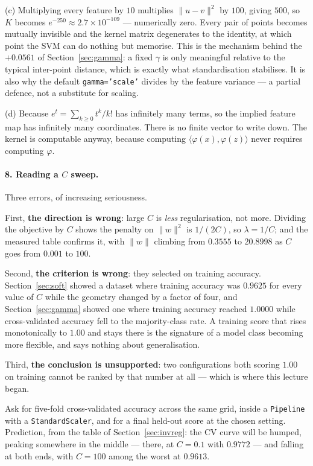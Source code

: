 \documentclass[11pt]{article}
\begin{document}
(c) Multiplying every feature by $10$ multiplies $\|u-v\|^2$ by $100$, giving
$500$, so $K$ becomes $e^{-250} \approx 2.7\times10^{-109}$ --- numerically
zero. Every pair of points becomes mutually invisible and the kernel matrix
degenerates to the identity, at which point the SVM can do nothing but
memorise. This is the mechanism behind the $+0.0561$ of
Section~\ref{sec:gamma}: a fixed $\gamma$ is only meaningful relative to the
typical inter-point distance, which is exactly what standardisation
stabilises. It is also why the default \texttt{gamma='scale'} divides by the
feature variance --- a partial defence, not a substitute for scaling.

(d) Because $e^{t} = \sum_{k \ge 0} t^k/k!$ has infinitely many terms, so the
implied feature map has infinitely many coordinates. There is no finite vector
to write down. The kernel is computable anyway, because computing
$\langle \varphi(x), \varphi(z)\rangle$ never requires computing
$\varphi$.

\paragraph{8. Reading a $C$ sweep.}
Three errors, of increasing seriousness.

First, \textbf{the direction is wrong}: large $C$ is \emph{less}
regularisation, not more. Dividing the objective by $C$ shows the penalty on
$\|w\|^2$ is $1/(2C)$, so $\lambda = 1/C$; and the measured table confirms it,
with $\|w\|$ climbing from $0.3555$ to $20.8998$ as $C$ goes from $0.001$ to
$100$.

Second, \textbf{the criterion is wrong}: they selected on training accuracy.
Section~\ref{sec:soft} showed a dataset where training accuracy was $0.9625$
for every value of $C$ while the geometry changed by a factor of four, and
Section~\ref{sec:gamma} showed one where training accuracy reached $1.0000$
while cross-validated accuracy fell to the majority-class rate. A training
score that rises monotonically to $1.00$ and stays there is the signature of a
model class becoming more flexible, and says nothing about generalisation.

Third, \textbf{the conclusion is unsupported}: two configurations both scoring
$1.00$ on training cannot be ranked by that number at all --- which is where
this lecture began.

Ask for five-fold cross-validated accuracy across the same grid, inside a
\texttt{Pipeline} with a \texttt{StandardScaler}, and for a final held-out
score at the chosen setting. Prediction, from the table of
Section~\ref{sec:invreg}: the CV curve will be humped, peaking somewhere in
the middle --- there, at $C = 0.1$ with $0.9772$ --- and falling at both ends,
with $C = 100$ among the worst at $0.9613$.
\end{document}
